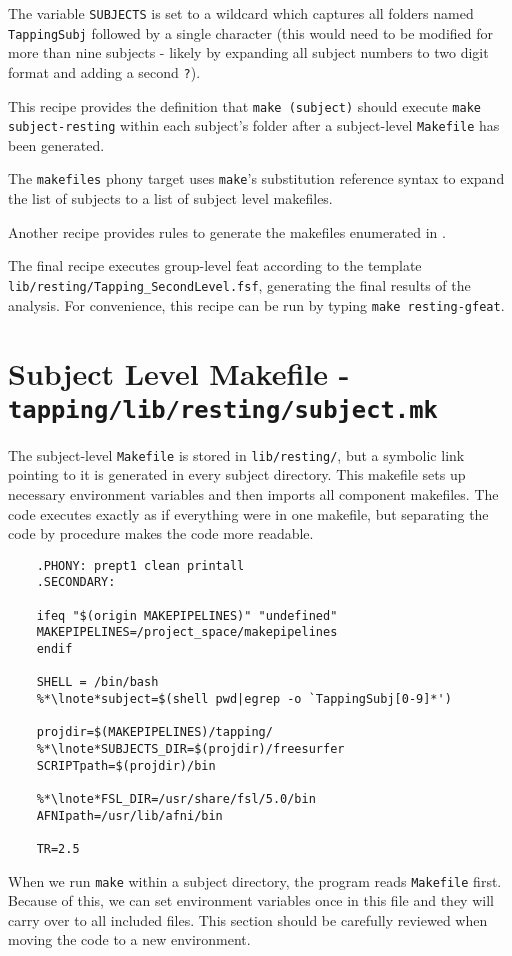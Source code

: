 The variable \texttt{SUBJECTS} is set to a wildcard which captures all folders named \texttt{TappingSubj} followed by a single character (this would need to be modified for more than nine subjects - likely by expanding all subject numbers to two digit format and adding a second \texttt{?}). 

This recipe provides the definition that \texttt{make (subject)} should execute \texttt{make subject-resting} within each subject's folder after a subject-level \texttt{Makefile} has been generated.

The \texttt{makefiles} phony target uses \texttt{make}'s substitution reference syntax to expand the list of subjects to a list of subject level makefiles. 

Another recipe provides rules to generate the makefiles enumerated in . 

The final recipe executes group-level feat according to the
template \texttt{lib/resting/Tapping_SecondLevel.fsf}, generating the
final results of the analysis. For convenience, this recipe can be run by typing \texttt{make resting-gfeat}.

\section{Subject Level Makefile - \texttt{tapping/lib/resting/subject.mk}}
The subject-level \texttt{Makefile} is stored in \texttt{lib/resting/}, but a symbolic link pointing to it is generated in every subject directory. This makefile sets up necessary environment variables and then imports all component makefiles. The code executes exactly as if everything were in one makefile, but separating the code by procedure makes the code more readable.
\begin{lstlisting}
	.PHONY: prept1 clean printall
	.SECONDARY:
	
	ifeq "$(origin MAKEPIPELINES)" "undefined"
	MAKEPIPELINES=/project_space/makepipelines
	endif
	
	SHELL = /bin/bash
	%*\lnote*subject=$(shell pwd|egrep -o `TappingSubj[0-9]*')
	
	projdir=$(MAKEPIPELINES)/tapping/
	%*\lnote*SUBJECTS_DIR=$(projdir)/freesurfer
	SCRIPTpath=$(projdir)/bin
	
	%*\lnote*FSL_DIR=/usr/share/fsl/5.0/bin
	AFNIpath=/usr/lib/afni/bin
	
	TR=2.5
\end{lstlisting}
When we run \texttt{make} within a subject directory, the program reads \texttt{Makefile} first. Because of this, we can set environment variables once in this file and they will carry over to all included files. This section should be carefully reviewed when moving the code to a new environment.

